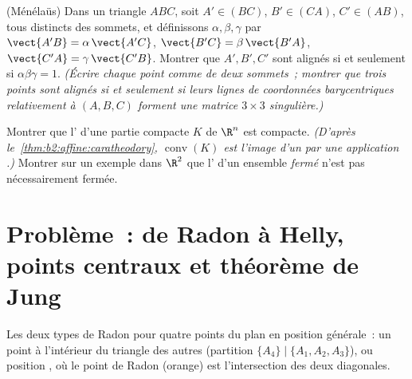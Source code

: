 \begin{exercise}[$\star\star$]\label{exo:b2:affine:11}
(Ménélaüs) Dans un triangle $ABC$, soit $A' \in (BC)$, $B' \in
(CA)$, $C' \in (AB)$, tous distincts des sommets, et
définissons $\alpha, \beta, \gamma$ par $\vect{A'B} =
\alpha\,\vect{A'C}$, $\vect{B'C} = \beta\,\vect{B'A}$,
$\vect{C'A} = \gamma\,\vect{C'B}$. Montrer que $A', B', C'$ sont
alignés si et seulement si $\alpha\beta\gamma = 1$. \emph{(Écrire
chaque point comme  de deux sommets~; montrer que trois
points sont alignés si et seulement si leurs lignes de coordonnées
barycentriques relativement à $(A, B, C)$ forment une matrice $3
\times 3$ singulière.)}
\end{exercise}

\begin{exercise}[$\star\star\star$]\label{exo:b2:affine:12}
Montrer que l' d'une partie compacte $K$ de $\R^n$
est compacte. \emph{(D'après le~\cref{thm:b2:affine:caratheodory},
$\operatorname{conv}(K)$ est l'image d'un  par une
application .)} Montrer sur un exemple dans $\R^2$ que
l' d'un ensemble \emph{fermé} n'est pas nécessairement
fermée.
\end{exercise}

\section{Problème~: de Radon à Helly, points centraux et théorème de
Jung}

\begin{omfigure}
\qquad
{}

{\small Les deux types de Radon pour quatre points du plan en
position générale~: un point à l'intérieur du triangle des autres
(partition $\{A_4\} \mid \{A_1, A_2, A_3\}$), ou position
, où le point de Radon (orange) est l'intersection
des deux diagonales.}
\end{omfigure}

